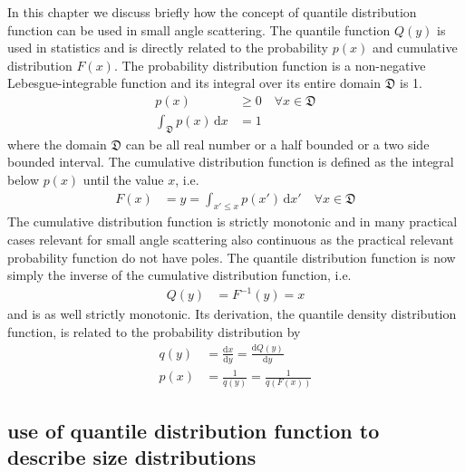 In this chapter we discuss briefly how the concept of quantile distribution function can be used in small angle scattering. The quantile function $Q(y)$ is used in statistics and is directly related to the probability $p(x)$ and cumulative distribution $F(x)$. The probability distribution function is a non-negative Lebesgue-integrable function and its integral over its entire domain $\mathfrak{D}$ is 1.
\begin{align}\label{eq:pdf}
  p(x) & \geq 0 \quad \forall x \in \mathfrak{D} \\
  \int_{\mathfrak{D}} p(x) \, \mathrm{d}x &= 1
\end{align}
where the domain $\mathfrak{D}$ can be all real number or a half bounded or a two side bounded interval.
The cumulative distribution function is defined as the integral below $p(x)$ until the value $x$, i.e.
\begin{align}\label{eq:cdf}
  F(x) & = y =\int_{x'\leq x} p(x')\, \mathrm{d}x' \quad \forall x \in \mathfrak{D}
\end{align}
The cumulative distribution function is strictly monotonic and in many practical cases relevant for small angle scattering also continuous as the practical relevant probability function do not have poles. The quantile distribution function is now simply the inverse of the cumulative distribution function, i.e.
\begin{align}\label{eq:qdf}
  Q(y) &= F^{-1}(y) = x
\end{align}
and is as well strictly monotonic. Its derivation, the quantile density distribution function, is related to the probability distribution by
\begin{align}\label{eq:qddf}
  q(y) & = \frac{\mathrm{d}x}{\mathrm{d}y} = \frac{\mathrm{d}Q(y)}{\mathrm{d}y} \\
  p(x) &= \frac{1}{q(y)} = \frac{1}{q\left(F(x)\right)}
\end{align}

\subsection{use of quantile distribution function to describe size distributions} ~\\


